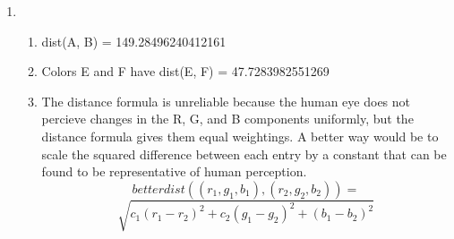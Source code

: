 \documentclass{article}
\begin{document}
\begin{enumerate}
\begin{enumerate}
	      \end{enumerate}

	\item
	      \begin{enumerate}
		      \item dist(A, B) = 149.28496240412161
		      \item Colors E and F have dist(E, F) = 47.7283982551269
		      \item The distance formula is unreliable because the human eye does not
		            percieve changes in the R, G, and B components uniformly, but the distance
		            formula gives them equal weightings. A better way would be to scale the
		            squared difference between each entry by a constant that can be found to be
		            representative of human perception. \\

		            $$
			            betterdist((r_1, g_1, b_1), (r_2, g_2, b_2)) =
		            $$
		            $$
			            \sqrt{c_1(r_1 - r_2)^2 + c_2(g_1 - g_2)^2 + (b_1 - b_2)^2}
		            $$
	      \end{enumerate}

\end{enumerate}
\end{document}
